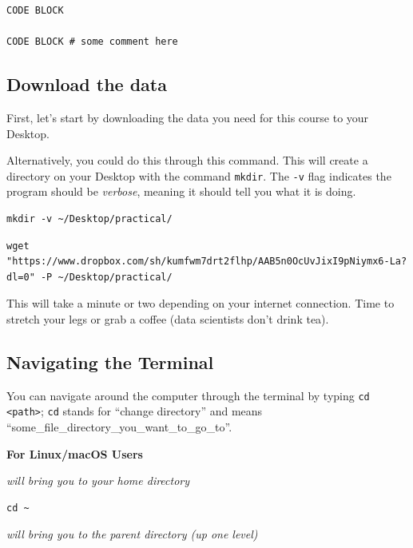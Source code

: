 \documentclass[
]{book}
\newcommand{\passthrough}[1]{#1}
\begin{document}
\begin{lstlisting}
CODE BLOCK

CODE BLOCK # some comment here
\end{lstlisting}

\hypertarget{download-the-data}{%
\subsection{Download the data}\label{download-the-data}}

First, let's start by downloading the data you need for this course to your Desktop.

Alternatively, you could do this through this command. This will create a directory on your Desktop with the command \passthrough{\lstinline!mkdir!}. The \passthrough{\lstinline!-v!} flag indicates the program should be \emph{verbose}, meaning it should tell you what it is doing.

\begin{lstlisting}
mkdir -v ~/Desktop/practical/
\end{lstlisting}

\begin{lstlisting}
wget "https://www.dropbox.com/sh/kumfwm7drt2flhp/AAB5n0OcUvJixI9pNiymx6-La?dl=0" -P ~/Desktop/practical/
\end{lstlisting}

This will take a minute or two depending on your internet connection. Time to stretch your legs or grab a coffee (data scientists don't drink tea).

\hypertarget{navigating-the-terminal}{%
\subsection{Navigating the Terminal}\label{navigating-the-terminal}}

You can navigate around the computer through the terminal by typing \passthrough{\lstinline!cd <path>!}; \passthrough{\lstinline!cd!} stands for ``change directory'' and means ``some\_file\_directory\_you\_want\_to\_go\_to''.

\textbf{For Linux/macOS Users}

\emph{will bring you to your home directory}

\begin{lstlisting}
cd ~ 
\end{lstlisting}

\emph{will bring you to the parent directory (up one level) }
\end{document}
